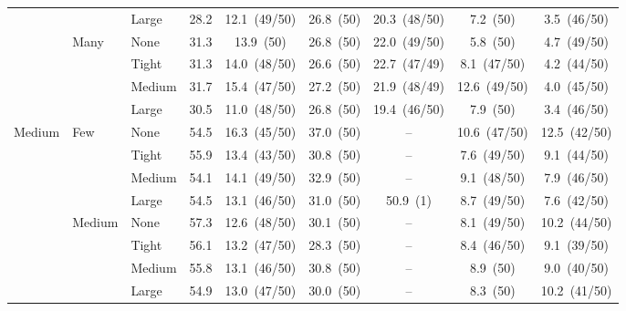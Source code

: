 \begin{table}[htbp]
\begin{tabular}{lll c ccccc}
 &  & {\small Large} & 28.2 & 12.1~{\scriptsize(49/50)} & 26.8~{\scriptsize(50)} & 20.3~{\scriptsize(48/50)} & 7.2~{\scriptsize(50)} & 3.5~{\scriptsize(46/50)} \\
 & \multirow{4}{*}{\small Many} & {\small None} & 31.3 & 13.9~{\scriptsize(50)} & 26.8~{\scriptsize(50)} & 22.0~{\scriptsize(49/50)} & 5.8~{\scriptsize(50)} & 4.7~{\scriptsize(49/50)} \\
 &  & {\small Tight} & 31.3 & 14.0~{\scriptsize(48/50)} & 26.6~{\scriptsize(50)} & 22.7~{\scriptsize(47/49)} & 8.1~{\scriptsize(47/50)} & 4.2~{\scriptsize(44/50)} \\
 &  & {\small Medium} & 31.7 & 15.4~{\scriptsize(47/50)} & 27.2~{\scriptsize(50)} & 21.9~{\scriptsize(48/49)} & 12.6~{\scriptsize(49/50)} & 4.0~{\scriptsize(45/50)} \\
 &  & {\small Large} & 30.5 & 11.0~{\scriptsize(48/50)} & 26.8~{\scriptsize(50)} & 19.4~{\scriptsize(46/50)} & 7.9~{\scriptsize(50)} & 3.4~{\scriptsize(46/50)} \\
\midrule
\multirow{12}{*}{\small Medium} & \multirow{4}{*}{\small Few} & {\small None} & 54.5 & 16.3~{\scriptsize(45/50)} & 37.0~{\scriptsize(50)} & -- & 10.6~{\scriptsize(47/50)} & 12.5~{\scriptsize(42/50)} \\
 &  & {\small Tight} & 55.9 & 13.4~{\scriptsize(43/50)} & 30.8~{\scriptsize(50)} & -- & 7.6~{\scriptsize(49/50)} & 9.1~{\scriptsize(44/50)} \\
 &  & {\small Medium} & 54.1 & 14.1~{\scriptsize(49/50)} & 32.9~{\scriptsize(50)} & -- & 9.1~{\scriptsize(48/50)} & 7.9~{\scriptsize(46/50)} \\
 &  & {\small Large} & 54.5 & 13.1~{\scriptsize(46/50)} & 31.0~{\scriptsize(50)} & 50.9~{\scriptsize(1)} & 8.7~{\scriptsize(49/50)} & 7.6~{\scriptsize(42/50)} \\
 & \multirow{4}{*}{\small Medium} & {\small None} & 57.3 & 12.6~{\scriptsize(48/50)} & 30.1~{\scriptsize(50)} & -- & 8.1~{\scriptsize(49/50)} & 10.2~{\scriptsize(44/50)} \\
 &  & {\small Tight} & 56.1 & 13.2~{\scriptsize(47/50)} & 28.3~{\scriptsize(50)} & -- & 8.4~{\scriptsize(46/50)} & 9.1~{\scriptsize(39/50)} \\
 &  & {\small Medium} & 55.8 & 13.1~{\scriptsize(46/50)} & 30.8~{\scriptsize(50)} & -- & 8.9~{\scriptsize(50)} & 9.0~{\scriptsize(40/50)} \\
 &  & {\small Large} & 54.9 & 13.0~{\scriptsize(47/50)} & 30.0~{\scriptsize(50)} & -- & 8.3~{\scriptsize(50)} & 10.2~{\scriptsize(41/50)} \\

\end{tabular}
\end{table}
